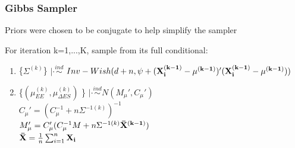 \documentclass[handout]{beamer}\usepackage[]{graphicx}\usepackage[]{color}
\begin{document}
\begin{frame}
\frametitle{Gibbs Sampler}
Priors were chosen to be conjugate to help simplify the sampler \\

\vspace{0.3cm}

For iteration k=1,...,K, sample from its full conditional:

\begin{enumerate}
% 
% 
% 




\item
 \{$\Sigma^{(k)}$\} $|\cdot \overset{ind}{\sim}$ $Inv-Wish(d+n,\psi+({\bf X_{i}^{(k-1)} - \mu^{(k-1)}})'({\bf X_{i}^{(k-1)} - \mu^{(k-1)}}))$ \\




\item
  \{$(\mu_{EE}^{(k)},\mu_{\Delta ES}^{(k)})$ \} $|\cdot \overset{ind}{\sim} N(M_{\mu}',C_{\mu}')$ \\
$C_{\mu}' = (C_{\mu}^{-1} + n \Sigma^{-1(k)})^{-1}$ \\
$M_{\mu}' = C_{\mu}'(C_{\mu}^{-1}M + n \Sigma^{-1(k)} {\bf \bar{X}^{(k-1)}})$ \\
${\bf \bar{X}} = \frac{1}{n}\sum_{i=1}^{n} {\bf X_{i}}$ \\


\end{enumerate}
\end{frame}
\end{document}
